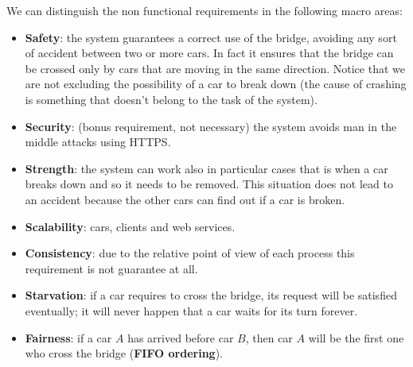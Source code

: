 We can distinguish the non functional requirements in the following macro areas:
\begin{itemize}
    \item \textbf{Safety}: the system guarantees a correct use of the bridge, avoiding 
        any sort of accident between two or more cars. 
        In fact it ensures that the bridge can be crossed only by cars that are moving 
        in the same direction. 
        Notice that we are not excluding the possibility of a car to break down 
        (the cause of crashing is something that doesn’t belong to the task of the system).
    \item \textbf{Security}: (bonus requirement, not necessary) 
        the system avoids man in the middle attacks using HTTPS.
    \item \textbf{Strength}: the system can work also in particular cases that is when a 
        car breaks down and so it needs to be removed. 
        This situation does not lead to an accident because the other cars can find out 
        if a car is broken.
    \item \textbf{Scalability}: cars, clients and web services.
    \item \textbf{Consistency}: due to the relative point of view of each process this 
    requirement is not guarantee at all.
    \item \textbf{Starvation}: if a car requires to cross the bridge, 
        its request will be satisfied eventually; 
    it will never happen that a car waits for its turn forever.
    \item \textbf{Fairness}: if a car $A$ has arrived before car $B$, 
        then car $A$ will be the first one who cross the bridge (\textbf{FIFO ordering}).
\end{itemize}